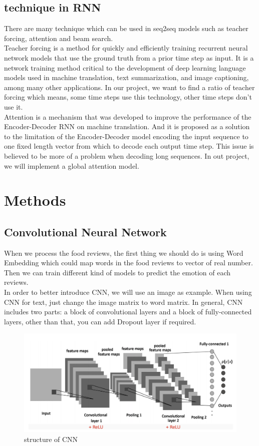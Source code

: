 \documentclass{article}
\begin{document}
\subsection{technique in RNN}
There are many technique which can be used in seq2seq models such as teacher forcing, attention and beam search.\\[2]
Teacher forcing is a method for quickly and efficiently training recurrent neural network models that use the ground truth from a prior time step as input. It is a network training method critical to the development of deep learning language models used in machine translation, text summarization, and image captioning, among many other applications. In our project, we want to find a ratio of teacher forcing which means, some time steps use this technology, other time steps don't use it.\\[2]
Attention is a mechanism that was developed to improve the performance of the Encoder-Decoder RNN on machine translation. And it is proposed as a solution to the limitation of the Encoder-Decoder model encoding the input sequence to one fixed length vector from which to decode each output time step. This issue is believed to be more of a problem when decoding long sequences. In out project, we will implement a global attention model.

\section{Methods}
\subsection{Convolutional Neural Network}
When we process the food reviews, the first thing we should do is using Word Embedding which could map words in the food reviews to vector of real number. Then we can train different kind of models to predict the emotion of each reviews.\\[2]
In order to better introduce CNN, we will use an image as example. When using CNN for text, just change the image matrix to word matrix.
In general, CNN includes two parts: a block of convolutional layers and a block of fully-connected layers, other than that, you can add Dropout layer if required. 
\begin{figure}[htbp]
\centering
\includegraphics[scale=0.45]{Structure.png}
\caption{structure of CNN}
\end{figure}
\end{document}
